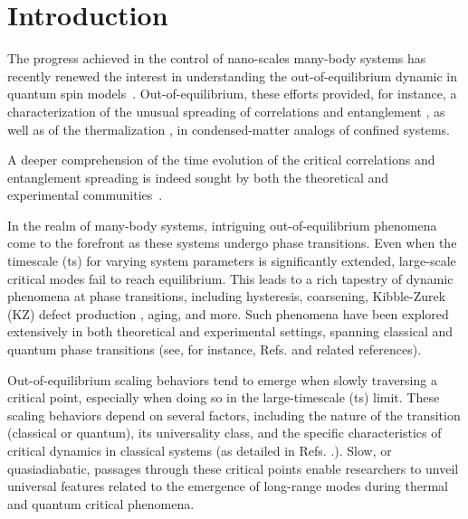 \chapter{Introduction}

The progress achieved in the control of nano-scales many-body systems has recently renewed the interest in understanding the out-of-equilibrium dynamic in quantum spin models~\cite{PSSV-2011-noneqcoll, GAN-2014-quantumsimulation}. Out-of-equilibrium, these efforts provided, for instance, a characterization of the unusual spreading of correlations and entanglement \cite{kormos2017real,lerose2020quasilocalized,tortora2020relaxation,lagnese2022quenches,scopa2022entanglement,castro2020entanglement,vovrosh2021confinement,rigobello2021entanglement}, as well as of the thermalization \cite{birnkammer2022prethermalization,james2019nonthermal,robinson2019signatures,chanda2020confinement}, in condensed-matter analogs of confined systems.


A deeper comprehension of the time evolution of the critical correlations and entanglement spreading is indeed sought by both the theoretical and experimental communities~\cite{ADM-2015-EntanglementReview}.


In the realm of many-body systems, intriguing out-of-equilibrium phenomena come to the forefront as these systems undergo phase transitions. Even when the timescale (ts) for varying system parameters is significantly extended, large-scale critical modes fail to reach equilibrium. This leads to a rich tapestry of dynamic phenomena at phase transitions, including hysteresis, coarsening, Kibble-Zurek (KZ) defect production
\cite{kibble1976topology,kibble1980some,zurek1985cosmological,zurek1996cosmological}, aging, and more. Such phenomena have been explored extensively in both theoretical and experimental settings, spanning classical and quantum phase transitions (see, for instance, Refs.                                                                                                                                                                             \cite{binder1987theory, cui2020experimentally, bray2002theory, weiler2008spontaneous,
dziarmaga2010dynamics, PSSV-2011-noneqcoll, ulm2013observation}  and related references).

Out-of-equilibrium scaling behaviors tend to emerge when slowly traversing a critical point, especially when doing so in the large-timescale (ts) limit. These scaling behaviors depend on several factors, including the nature of the transition (classical or quantum), its universality class, and the specific characteristics of critical dynamics in classical systems (as detailed in Refs. \cite{kibble1980some, zurek1996cosmological, dziarmaga2010dynamics, PSSV-2011-noneqcoll}.). Slow, or quasiadiabatic, passages through these critical points enable researchers to unveil universal features related to the emergence of long-range modes during thermal and quantum critical phenomena.

